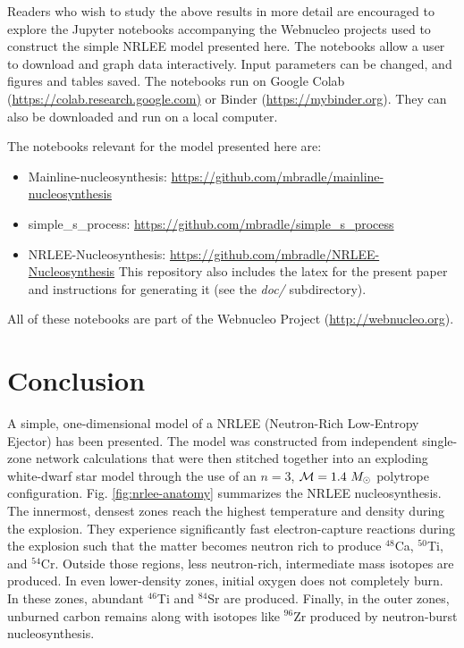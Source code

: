 \documentclass[preprint]{revtex4-2}
\begin{document}
Readers who wish to study the above results in 
more detail are encouraged to explore the Jupyter notebooks accompanying
the Webnucleo projects used to construct the simple NRLEE model presented
here.  The notebooks allow a user to download and graph data interactively.
Input parameters can be changed, and figures and tables saved.  The
notebooks run on Google Colab (\url{https://colab.research.google.com)} or
Binder (\url{https://mybinder.org}).  They can also be downloaded and run
on a local computer.

The notebooks relevant for the model presented here are:
\begin{itemize}
\item Mainline-nucleosynthesis: \url{https://github.com/mbradle/mainline-nucleosynthesis}
\item simple\_s\_process: \url{https://github.com/mbradle/simple_s_process}
\item NRLEE-Nucleosynthesis: \url{https://github.com/mbradle/NRLEE-Nucleosynthesis}  This repository also includes the latex for the present paper and
instructions for generating it (see the {\it doc/} subdirectory).
\end{itemize}
All of these notebooks are part of the Webnucleo Project
(\url{http://webnucleo.org}).

\section{Conclusion}

A simple, one-dimensional model of a NRLEE (Neutron-Rich Low-Entropy
Ejector) has been presented.  The model was constructed from independent
single-zone network calculations that were then stitched together into
an exploding white-dwarf star model through the use of an $n = 3$, 
${\cal M} = 1.4\ M_\odot$ polytrope configuration.
Fig. \ref{fig:nrlee-anatomy} summarizes the NRLEE nucleosynthesis.
The innermost, densest zones reach the highest temperature and density
during the explosion.  They experience significantly fast electron-capture
reactions during the explosion such that the matter becomes neutron rich
to produce $^{48}$Ca, $^{50}$Ti, and $^{54}$Cr.  Outside those regions,
less neutron-rich, intermediate mass isotopes are produced.  In even
lower-density zones, initial oxygen does not completely burn.  In these
zones, abundant $^{46}$Ti and $^{84}$Sr are produced.  Finally, in the outer
zones, unburned carbon remains along with isotopes like $^{96}$Zr produced
by neutron-burst nucleosynthesis.
\end{document}

